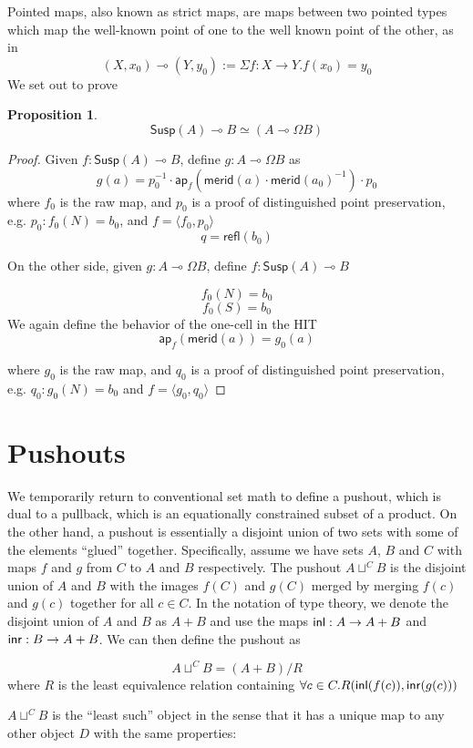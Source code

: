 \documentclass[11pt]{article}
\renewcommand{\refl}{\mathsf{refl}}
\newcommand{\lolli}{\multimap}
\newcommand*{\ap}{\mathsf{ap}}
\newcommand{\merid}{\mathsf{merid}}
\newcommand{\susp}[1]{\mathsf{Susp}(#1)}
\newtheorem{proposition}{Proposition}
\begin{document}
Pointed maps, also known as strict maps, are maps between two pointed types which map the well-known point of one to the well known point of the other, as in
$$(X, x_0) \lolli (Y, y_0) := \Sigma f : X \to Y . f(x_0) = y_0$$
We set out to prove
\begin{proposition}
$$\susp{A} \lolli B \simeq (A \lolli \Omega B)$$
\end{proposition}
\begin{proof}
Given $f : \susp{A} \lolli B$, define $g : A \lolli \Omega B$ as
$$g(a) = p_0^{-1} \cdot \ap_f(\merid(a) \cdot \merid(a_0)^{-1}) \cdot p_0$$
where $f_0$ is the raw map, and $p_0$ is a proof of distinguished point preservation, e.g. $p_0 : f_0(N) = b_0$, and $f = \langle f_0, p_0\rangle$
$$q = \refl(b_0)$$

On the other side, given $g : A \lolli \Omega B$, define $f : \susp{A} \lolli B$

$$f_0(N) = b_0$$
$$f_0(S) = b_0$$
We again define the behavior of the one-cell in the HIT
$$\ap_f(\merid(a)) = g_0(a)$$

where $g_0$ is the raw map, and $q_0$ is a proof of distinguished point preservation, e.g. $q_0 : g_0(N) = b_0$ and $f = \langle g_0, q_0\rangle$
\end{proof}

\section{Pushouts}
We temporarily return to conventional set math to define a pushout, which is
dual to a pullback, which is an equationally constrained subset of a product.
On the other hand, a pushout is essentially a disjoint union of two sets 
with some of the elements ``glued'' together. Specifically, assume we have
sets $A$, $B$ and $C$ with maps $f$ and $g$ from $C$ to $A$ and $B$ 
respectively. The pushout 
$A \sqcup^C B$ is the disjoint union of $A$ and $B$ with the images $f(C)$ and
$g(C)$ merged by merging $f(c)$ and $g(c)$ together for all $c \in C$. In the
notation of type theory, we denote the disjoint union of $A$ and $B$ as 
$A + B$ and use the maps ${\mathsf{inl}}: A \to A + B$ and ${\mathsf{inr}}: B \to A + B$. We
can then define the pushout as

$$A \sqcup^C B = (A + B) / R$$
where $R$ is the least equivalence relation containing 
$\forall c \in C. R({\mathsf{inl}}(f(c)), {\mathsf{inr}}(g(c)))$

$A \sqcup^C B$ is the ``least such'' object in the sense that it has a unique
map to any other object $D$ with the same properties:
\end{document}
